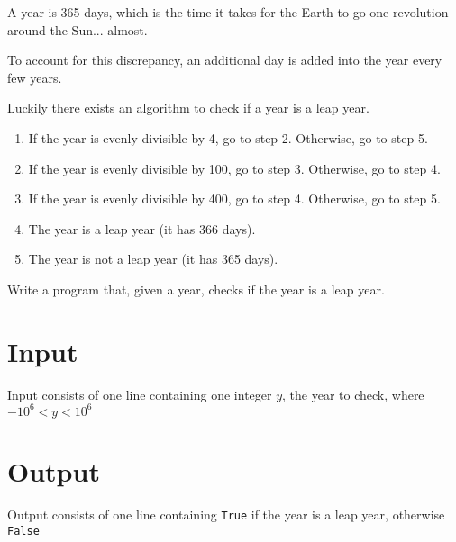 
A year is 365 days, which is the time it takes for the Earth to go one revolution around the Sun... almost.

To account for this discrepancy, an additional day is added into the year every few years.

Luckily there exists an algorithm to check if a year is a leap year.

\begin{enumerate}
	\item If the year is evenly divisible by 4, go to step 2. Otherwise, go to step 5.
	\item If the year is evenly divisible by 100, go to step 3. Otherwise, go to step 4.
	\item If the year is evenly divisible by 400, go to step 4. Otherwise, go to step 5.
	\item The year is a leap year (it has 366 days).
	\item The year is not a leap year (it has 365 days).
\end{enumerate}
Write a program that, given a year, checks if the year is a leap year.

\section*{Input}
Input consists of one line containing one integer $y$, the year to check, where $-10^6 < y < 10^6$

\section*{Output}
Output consists of one line containing \texttt{True} if the year is a leap year, otherwise \texttt{False}
